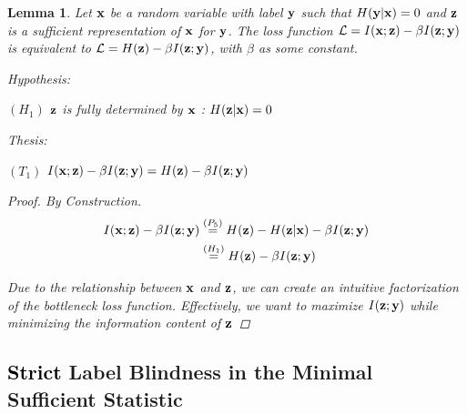 \documentclass{article} %
\theoremstyle{plain}
\newtheorem{lemma}[theorem]{Lemma}
\theoremstyle{definition}
\theoremstyle{remark}
\begin{document}
\begin{lemma}
    Let ${\mathbf{x}}$ be a random variable with label ${\mathbf{y}}$ such that $H({\mathbf{y}}| {\mathbf{x}}) = 0$ and ${\mathbf{z}}$ is a sufficient representation of ${\mathbf{x}}$ for ${\mathbf{y}}$. The loss function 
    $\mathcal{L}=I({\mathbf{x}}; {\mathbf{z}})-\beta I({\mathbf{z}}; {\mathbf{y}})$ is equivalent to $\mathcal{L}=H({\mathbf{z}})-\beta I({\mathbf{z}}; {\mathbf{y}})$, with $\beta$ as some constant. 

    Hypothesis: 
    
    $(H_1)$  ${\mathbf{z}}$ is fully determined by ${\mathbf{x}}$ : $H({\mathbf{z}}|{\mathbf{x}}) = 0$

    Thesis: 

    $(T_1)$ $ I({\mathbf{x}}; {\mathbf{z}})-\beta I({\mathbf{z}}; {\mathbf{y}}) = H({\mathbf{z}})-\beta I({\mathbf{z}}; {\mathbf{y}})$

    \begin{proof} By Construction. 
    $$
        \begin{aligned}
        I({\mathbf{x}}; {\mathbf{z}})-\beta I({\mathbf{z}}; {\mathbf{y}}) &\stackrel{\left(P_5\right)}{=} H({\mathbf{z}}) - H({\mathbf{z}}| {\mathbf{x}}) -\beta I({\mathbf{z}};{\mathbf{y}}) \\
        &\stackrel{\left(H_1\right)}{=} H({\mathbf{z}}) -\beta I({\mathbf{z}}; {\mathbf{y}})
        \end{aligned}
    $$

    Due to the relationship between ${\mathbf{x}}$ and ${\mathbf{z}}$, we can create an intuitive factorization of the bottleneck loss function. Effectively, we want to maximize $I({\mathbf{z}}; {\mathbf{y}})$ while minimizing the information content of ${\mathbf{z}}$

    \end{proof}

    \label{lossfact}
\end{lemma}

\subsection{\textcolor{black}{Strict} Label Blindness in the Minimal Sufficient Statistic}
\end{document}
